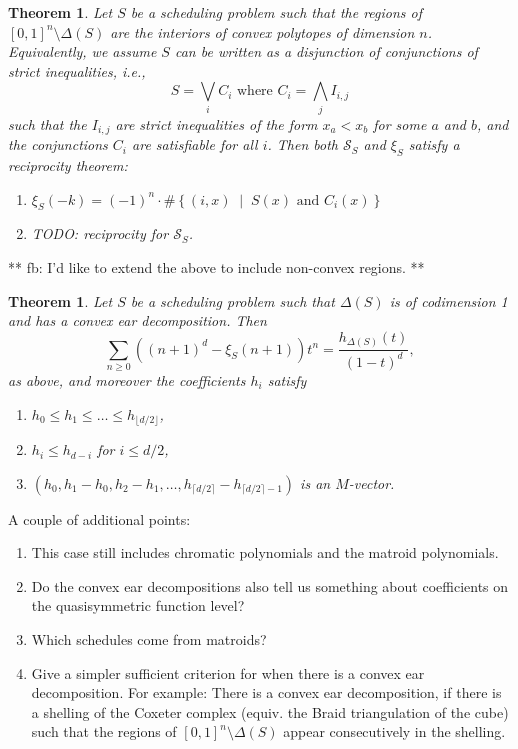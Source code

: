 \documentclass[12pt]{amsart}
\newtheorem{theorem}[definition]{Theorem}
\newcommand{\SSS}{\mathcal{S}}
\newcommand{\floor}[1]{\lfloor {#1} \rfloor}
\newcommand{\ceil}[1]{\lceil {#1} \rceil}
\newcommand{\mset}[2]{ \left\{ #1 \; \middle| \; #2 \right\}}
\begin{document}
\begin{theorem}
Let $S$ be a scheduling problem such that the regions of $[0,1]^n\setminus\Delta(S)$ are the interiors of convex polytopes of dimension $n$. Equivalently, we assume $S$ can be written as a disjunction of conjunctions of strict inequalities, i.e.,
\[
  S = \bigvee_i C_i \text{ where } C_i = \bigwedge_j I_{i,j}
\] 
such that the $I_{i,j}$ are strict inequalities of the form $x_a < x_b$ for some $a$ and $b$, and the conjunctions $C_i$ are satisfiable for all $i$. Then both $\SSS_S$ and $\xi_S$ satisfy a reciprocity theorem:
\begin{enumerate}
\item $\xi_S(-k) = (-1)^n\cdot \#\mset{(i,x)}{S(x) \text{ and } C_i(x)}$
\item TODO: reciprocity for $\SSS_S$.
\end{enumerate}
\end{theorem}

** fb: I'd like to extend the above to include non-convex regions. **

\begin{theorem}
Let $S$ be a scheduling problem such that $\Delta(S)$ is of codimension 1 and has a convex ear decomposition. Then 
\[
  \sum_{n \geq 0} ((n+1)^d - \xi_S(n+1)) t^n = \frac{h_{\Delta(S)}(t)}{(1-t)^d},
\]
as above, and moreover the coefficients $h_i$ satisfy
\begin{enumerate}
\item $h_0 \leq h_1 \leq \ldots \leq h_{\floor{d/2}}$,
\item $h_i\leq h_{d-i}$ for $i\leq d/2$,
\item $(h_0,h_1-h_0,h_2-h_1,\ldots,h_{\ceil{d/2}}-h_{\ceil{d/2}-1})$ is an $M$-vector.
\end{enumerate}
\end{theorem}

A couple of additional points:
\begin{enumerate} 
\item This case still includes chromatic polynomials and the matroid polynomials.
\item Do the convex ear decompositions also tell us something about coefficients on the quasisymmetric function level?
\item Which schedules come from matroids? 
\item Give a simpler sufficient criterion for when there is a convex ear decomposition. For example: There is a convex ear decomposition, if there is a shelling of the Coxeter complex (equiv. the Braid triangulation of the cube) such that the regions of $[0,1]^n\setminus\Delta(S)$ appear consecutively in the shelling.
\end{enumerate}
\end{document}
